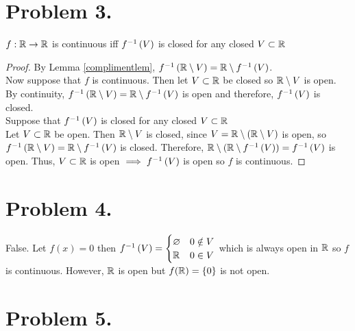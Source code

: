 \documentclass[12pt]{extarticle}
\begin{document}
\section*{Problem 3.}
$f : \mathbb{R} \rightarrow \mathbb{R}$ is continuous iff $f^{-1} \left( V \right)$ is closed for any closed $V \subset \mathbb{R}$ 
\begin{proof}
By Lemma \ref{complimentlem}, $f^{-1} \left( \mathbb{R} \setminus V \right) = \mathbb{R} \setminus f^{-1} \left( V \right)$. \\

Now suppose that $f$ is continuous. Then let $V \subset \mathbb{R}$ be closed so $\mathbb{R} \setminus V$ is open. By continuity, $f^{-1} \left( \mathbb{R} \setminus V \right) = \mathbb{R} \setminus f^{-1} \left( V \right)$ is open and therefore, $f^{-1} \left( V \right)$ is closed. \\

Suppose that $f^{-1} \left( V \right)$ is closed for any closed $V \subset \mathbb{R}$ \\
Let $V \subset \mathbb{R}$ be open. Then $\mathbb{R} \setminus V$ is closed, since $V = \mathbb{R} \setminus (\mathbb{R} \setminus V)$ is open, so $f^{-1} \left( \mathbb{R} \setminus V \right) = \mathbb{R} \setminus f^{-1} \left( V \right)$ is closed. Therefore, $\mathbb{R} \setminus (\mathbb{R} \setminus f^{-1} \left( V \right)) = f^{-1} \left( V \right)$ is open. Thus, $V \subset \mathbb{R}$ is open $\implies f^{-1} \left( V \right)$ is open so $f$ is continuous. 
\end{proof}

\section*{Problem 4.} 

False. Let $f(x) = 0$ then $f^{-1} \left( V \right) = \begin{cases} 
	\varnothing &  0 \notin V \\
	\mathbb{R}   &  0 \in V
	\end{cases}$ which is always open in $\mathbb{R}$ so $f$ is continuous. However, $\mathbb{R}$ is open but $f(\mathbb{R}) = \{0\}$ is not open. 
	
\section*{Problem 5.}
\end{document}
